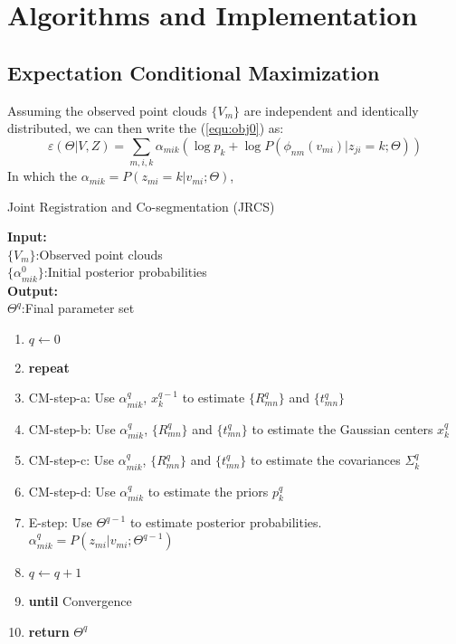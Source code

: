 \section{Algorithms and Implementation}
\label{sec:imp}
\subsection{Expectation Conditional Maximization}
Assuming the observed point clouds $\{V_m\}$ are independent and identically distributed, we can then write the (\ref{equ:obj0}) as: 
\begin{equation}
\label{equ:obj1}
\varepsilon(\Theta|V,Z) =\sum_{m,i,k}\alpha_{mik}(\log p_k +\log P(\phi_{nm}(v_{mi})|z_{ji}=k;\Theta))
\end{equation}
In which the $\alpha_{mik}=P(z_{mi}=k|v_{mi};\Theta)$,
\begin{algorithm}[htb]
	\caption{Joint Registration and Co-segmentation (JRCS)}
	\label{alg:jrcs}
	\textbf{Input:}~~\\
	$\{V_m\}$:Observed point clouds\\
	$\{\alpha_{mik}^0\}$:Initial posterior probabilities~~\\
	\textbf{Output:}~~\\
	$\Theta^q$:Final parameter set~~
	\begin{enumerate}
		\item $q\leftarrow0$
		\item \textbf{repeat}
		\item CM-step-a: Use $\alpha^q_{mik}$, $x^{q-1}_k$ to estimate $\{R_{mn}^q\}$ and $\{t_{mn}^q\}$
		\item CM-step-b: Use $\alpha^q_{mik}$, $\{R_{mn}^q\}$ and $\{t_{mn}^q\}$ to estimate the Gaussian centers $x_k^q$
		\item CM-step-c: Use $\alpha^q_{mik}$, $\{R_{mn}^q\}$ and $\{t_{mn}^q\}$ to estimate the covariances $\Sigma_k^q$
		\item CM-step-d: Use $\alpha^q_{mik}$ to estimate the priors $p_k^q$
		\item E-step: Use $\Theta^{q-1}$ to estimate posterior probabilities. $\alpha^q_{mik}=P(z_{mi}|v_{mi};\Theta^{q-1})$
		\item $q \leftarrow q+1$
		\item \textbf{until} Convergence
		\item \textbf{return} $\Theta^q$
	\end{enumerate}
\end{algorithm}

